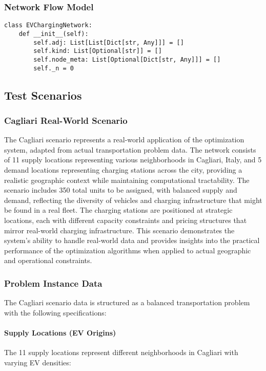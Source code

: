 \documentclass[12pt,a4paper]{article}
\begin{document}
\subsubsection{Network Flow Model}
\begin{lstlisting}[caption=Residual Network Structure]
class EVChargingNetwork:
    def __init__(self):
        self.adj: List[List[Dict[str, Any]]] = []
        self.kind: List[Optional[str]] = []
        self.node_meta: List[Optional[Dict[str, Any]]] = []
        self._n = 0
\end{lstlisting}

\subsection{Test Scenarios}

\subsubsection{Cagliari Real-World Scenario}

The Cagliari scenario represents a real-world application of the optimization system, adapted from actual transportation problem data. The network consists of 11 supply locations representing various neighborhoods in Cagliari, Italy, and 5 demand locations representing charging stations across the city, providing a realistic geographic context while maintaining computational tractability. The scenario includes 350 total units to be assigned, with balanced supply and demand, reflecting the diversity of vehicles and charging infrastructure that might be found in a real fleet. The charging stations are positioned at strategic locations, each with different capacity constraints and pricing structures that mirror real-world charging infrastructure. This scenario demonstrates the system's ability to handle real-world data and provides insights into the practical performance of the optimization algorithms when applied to actual geographic and operational constraints.

\subsubsection{Problem Instance Data}

The Cagliari scenario data is structured as a balanced transportation problem with the following specifications:

\paragraph{Supply Locations (EV Origins)}
The 11 supply locations represent different neighborhoods in Cagliari with varying EV densities:
\end{document}
